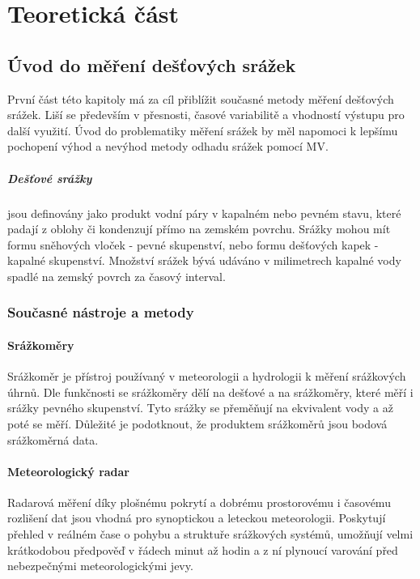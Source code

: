 \documentclass[a4paper,12pt]{report}
\begin{document}
 



\newpage
\chapter*{Teoretická část}



\section{Úvod do měření dešťových srážek}
První část této kapitoly má za cíl přiblížit současné metody měření dešťových srážek. Liší se především v přesnosti, časové variabilitě a vhodností výstupu pro další využití. Úvod do problematiky měření srážek by měl napomoci k lepšímu pochopení výhod a nevýhod metody odhadu srážek pomocí MV.

\paragraph*{Dešťové srážky}jsou definovány jako produkt vodní páry v kapalném nebo pevném stavu, které padají z oblohy či kondenzují přímo na zemském povrchu. Srážky mohou mít formu sněhových vloček - pevné skupenství, nebo formu dešťových kapek - kapalné skupenství. Množství srážek bývá udáváno v milimetrech kapalné vody spadlé na zemský povrch za časový interval.\cite{wmo} 

\subsection{Současné nástroje a metody }
\label{subsec:11}

\subsubsection{Srážkoměry}
Srážkoměr je přístroj používaný v meteorologii a hydrologii k měření srážkových úhrnů. Dle funkčnosti se srážkoměry dělí na dešťové a na srážkoměry, které měří i srážky pevného skupenství. Tyto srážky se přeměňují na ekvivalent vody a až poté se měří. Důležité je podotknout, že produktem srážkoměrů jsou bodová srážkoměrná data.


\subsubsection{Meteorologický radar}
Radarová měření díky plošnému pokrytí a dobrému prostorovému i časovému rozlišení dat jsou vhodná pro synoptickou a leteckou meteorologii. Poskytují přehled v reálném čase o pohybu a struktuře srážkových systémů, umožňují velmi krátkodobou předpověď v řádech minut až hodin a z ní plynoucí varování před nebezpečnými meteorologickými jevy.\cite{radar_chmu}
\end{document}
